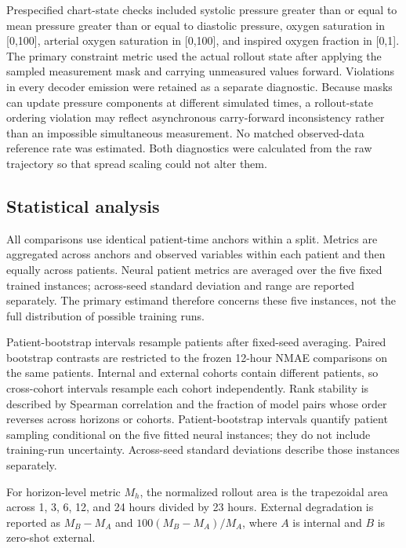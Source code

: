 \documentclass[conference]{IEEEtran}
\begin{document}
Prespecified chart-state checks included systolic pressure greater than or
equal to mean
pressure greater than or equal to diastolic pressure, oxygen saturation in
{[}0,100{]}, arterial oxygen saturation in {[}0,100{]}, and inspired oxygen fraction
in {[}0,1{]}. The primary constraint metric used the actual rollout state after
applying the sampled measurement mask and carrying unmeasured values forward.
Violations in every decoder emission were retained as a separate diagnostic.
Because masks can update pressure components at different simulated times, a
rollout-state ordering violation may reflect asynchronous carry-forward
inconsistency rather than an impossible simultaneous measurement. No matched
observed-data reference rate was estimated. Both diagnostics were calculated
from the raw trajectory so that spread scaling could not alter them.

\subsection{Statistical analysis}\label{statistical-analysis}

All comparisons use identical patient-time anchors within a split. Metrics are
aggregated across anchors and observed variables within each patient and then
equally across patients. Neural patient metrics are averaged over the five
fixed trained instances; across-seed standard deviation and range are reported
separately. The primary estimand therefore concerns these five instances, not
the full distribution of possible training runs.

Patient-bootstrap intervals resample patients after fixed-seed averaging.
Paired bootstrap contrasts are restricted to the frozen 12-hour NMAE
comparisons on the same patients. Internal and external cohorts contain
different patients, so cross-cohort intervals resample each cohort
independently. Rank stability is described by Spearman correlation and the
fraction of model pairs whose order reverses across horizons or cohorts.
Patient-bootstrap intervals quantify patient sampling conditional on the five
fitted neural instances; they do not include training-run uncertainty.
Across-seed standard deviations describe those instances separately.

For horizon-level metric \(M_h\), the normalized rollout area is the
trapezoidal area across 1, 3, 6, 12, and 24 hours divided by 23 hours. External
degradation is reported as \(M_B-M_A\) and
\(100(M_B-M_A)/M_A\), where \(A\) is internal and \(B\) is zero-shot external.
\end{document}
